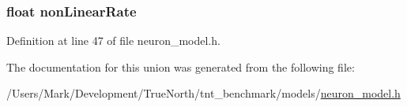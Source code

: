 \subsubsection[{non\+Linear\+Rate}]{\setlength{\rightskip}{0pt plus 5cm}float non\+Linear\+Rate}\label{union_reset_rate_a54aaba14ce85fd9c5d7b385d98727e36}


Definition at line 47 of file neuron\+\_\+model.\+h.



The documentation for this union was generated from the following file\+:\begin{DoxyCompactItemize}
\item 
/\+Users/\+Mark/\+Development/\+True\+North/tnt\+\_\+benchmark/models/\hyperlink{neuron__model_8h}{neuron\+\_\+model.\+h}\end{DoxyCompactItemize}
